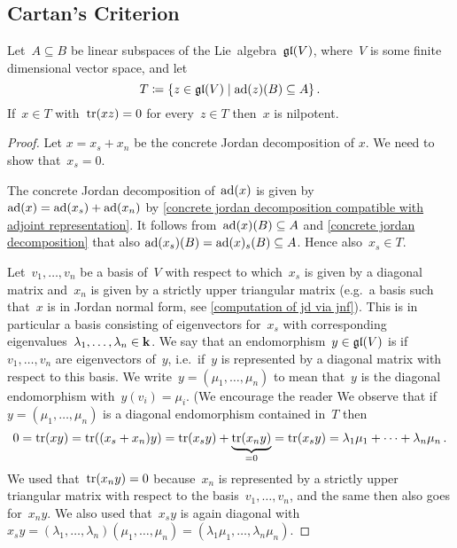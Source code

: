 \subsection{Cartan’s Criterion}


\begin{lemma}
  \label{cartans criterion technical lemma}
  Let~$A \subseteq B$ be linear subspaces of the Lie~algebra~$\mathfrak{gl}(V)$, where~$V$ is some finite dimensional vector space, and let
  \[
    T
    \defined
    \{
      z \in \gllie(V)
    \suchthat
      \ad(z)(B) \subseteq A
    \}  \,.
  \]
  If~$x \in T$ with~$\operatorname{tr}(xz) = 0$ for every~$z \in T$ then~$x$ is nilpotent.
\end{lemma}
% 
\begin{proof}
  Let $x = x_s + x_n$ be the concrete Jordan decomposition of $x$.
  We need to show that~$x_s = 0$.
  
  The concrete Jordan decomposition of~$\operatorname{ad}(x)$ is given by~$\operatorname{ad}(x) = \operatorname{ad}(x_s) + \operatorname{ad}(x_n)$ by \cref{concrete jordan decomposition compatible with adjoint representation}.
  It follows from~$\operatorname{ad}(x)(B) \subseteq A$ and \cref{concrete jordan decomposition} that also $\operatorname{ad}(x_s)(B) = \operatorname{ad}(x)_s(B) \subseteq A$.
  Hence also~$x_s \in T$.
  
  Let~$v_1, \dotsc, v_n$ be a basis of~$V$ with respect to which~$x_s$ is given by a diagonal matrix and~$x_n$ is given by a strictly upper triangular matrix (e.g.\ a basis such that~$x$ is in Jordan normal form, see \cref{computation of jd via jnf}).
  This is in particular a basis consisting of eigenvectors for~$x_s$ with corresponding eigenvalues~$\lambda_1, \dotsc, \lambda_n \in \mathbf{k}$.
  We say that an endomorphism~$y \in \mathfrak{gl}(V)$ is  if~$v_1, \dotsc, v_n$ are eigenvectors of~$y$, i.e.\ if~$y$ is represented by a diagonal matrix with respect to this basis.
  We write~$y = (\mu_1, \dotsc, \mu_n)$ to mean that~$y$ is the diagonal endomorphism with~$y(v_i) = \mu_i$.
  (We encourage the reader
  We observe that if~$y = (\mu_1, \dotsc, \mu_n)$ is a diagonal endomorphism contained in~$T$ then
  \[
    0
    =
    \operatorname{tr}(xy)
    =
    \operatorname{tr}((x_s + x_n)y)
    =
    \operatorname{tr}(x_s y) + \underbrace{\operatorname{tr}(x_n y)}_{=0}
    =
    \operatorname{tr}(x_s y)
    =
    \lambda_1 \mu_1 + \dotsb + \lambda_n \mu_n  \,.
  \]
  We used that~$\operatorname{tr}(x_n y) = 0$ because~$x_n$ is represented by a strictly upper triangular matrix with respect to the basis~$v_1, \dotsc, v_n$, and the same then also goes for~$x_n y$.
  We also used that~$x_s y$ is again diagonal with~$x_s y = (\lambda_1, \dotsc, \lambda_n)(\mu_1, \dotsc, \mu_n) = (\lambda_1 \mu_1, \dotsc, \lambda_n \mu_n)$.
  

\end{proof}
